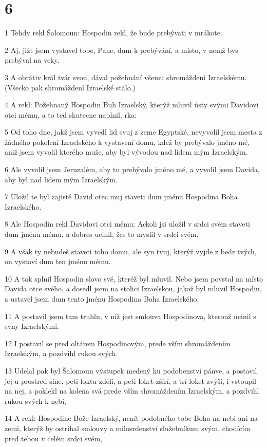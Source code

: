 \chapter{6}

\par 1 Tehdy rekl Šalomoun: Hospodin rekl, že bude prebývati v mrákote.
\par 2 Aj, jižt jsem vystavel tobe, Pane, dum k prebývání, a místo, v nemž bys prebýval na veky.
\par 3 A obrátiv král tvár svou, dával požehnání všemu shromáždení Izraelskému. (Všecko pak shromáždení Izraelské stálo.)
\par 4 A rekl: Požehnaný Hospodin Buh Izraelský, kterýž mluvil ústy svými Davidovi otci mému, a to ted skutecne naplnil, rka:
\par 5 Od toho dne, jakž jsem vyvedl lid svuj z zeme Egyptské, nevyvolil jsem mesta z žádného pokolení Izraelského k vystavení domu, kdež by prebývalo jméno mé, aniž jsem vyvolil kterého muže, aby byl vývodou nad lidem mým Izraelským.
\par 6 Ale vyvolil jsem Jeruzalém, aby tu prebývalo jméno mé, a vyvolil jsem Davida, aby byl nad lidem mým Izraelským.
\par 7 Uložil te byl zajisté David otec muj staveti dum jménu Hospodina Boha Izraelského.
\par 8 Ale Hospodin rekl Davidovi otci mému: Ackoli jsi uložil v srdci svém staveti dum jménu mému, a dobres ucinil, žes to myslil v srdci svém,
\par 9 A však ty nebudeš staveti toho domu, ale syn tvuj, kterýž vyjde z bedr tvých, on vystaví dum ten jménu mému.
\par 10 A tak splnil Hospodin slovo své, kteréž byl mluvil. Nebo jsem povstal na místo Davida otce svého, a dosedl jsem na stolici Izraelskou, jakož byl mluvil Hospodin, a ustavel jsem dum tento jménu Hospodina Boha Izraelského.
\par 11 A postavil jsem tam truhlu, v níž jest smlouva Hospodinova, kterouž ucinil s syny Izraelskými.
\par 12 I postavil se pred oltárem Hospodinovým, prede vším shromáždením Izraelským, a pozdvihl rukou svých.
\par 13 Udelal pak byl Šalomoun výstupek medený ku podobenství pánve, a postavil jej u prostred síne, peti loktu zdélí, a peti loket zšírí, a trí loket zvýší, i vstoupil na nej, a poklekl na kolena svá prede vším shromáždením Izraelským, a pozdvihl rukou svých k nebi,
\par 14 A rekl: Hospodine Bože Izraelský, nenít podobného tobe Boha na nebi ani na zemi, kterýž by ostríhal smlouvy a milosrdenství služebníkum svým, chodícím pred tebou v celém srdci svém,
